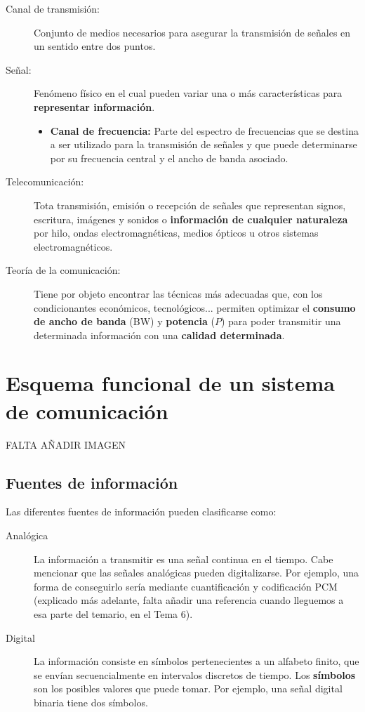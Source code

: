 \documentclass[a4paper]{book}
\begin{document}
\begin{description}
	 \item[Canal de transmisión:] Conjunto de medios necesarios para asegurar la transmisión de señales en un sentido entre dos puntos.
	 \item[Señal:] Fenómeno físico en el cual pueden variar una o más características para \textbf{representar información}.
	 \begin{itemize}
		  \item \textbf{Canal de frecuencia:} Parte del espectro de frecuencias que se destina a ser utilizado para la transmisión de señales y que puede determinarse por su frecuencia central y el ancho de banda asociado. 
	 \end{itemize} 
	 \item[Telecomunicación:] Tota transmisión, emisión o recepción de señales que representan signos, escritura, imágenes y sonidos o \textbf{información de cualquier naturaleza} por hilo, ondas electromagnéticas, medios ópticos u otros sistemas electromagnéticos.
	 \item[Teoría de la comunicación:] Tiene por objeto encontrar las técnicas más adecuadas que, con los condicionantes económicos, tecnológicos... permiten optimizar el \textbf{consumo de ancho de banda} (BW) y \textbf{potencia} ($P$) para poder transmitir una determinada información con una \textbf{calidad determinada}.
\end{description}

\section{Esquema funcional de un sistema de comunicación}
FALTA AÑADIR IMAGEN 

\subsection{Fuentes de información}

Las diferentes fuentes de información pueden clasificarse como:
\begin{description}
	 \item[Analógica] La información a transmitir es una señal continua en el tiempo. Cabe mencionar que las señales analógicas pueden digitalizarse. Por ejemplo, una forma de conseguirlo sería mediante cuantificación y codificación PCM (explicado más adelante, falta añadir una referencia cuando lleguemos a esa parte del temario, en el Tema 6).
	 \item[Digital] La información consiste en símbolos pertenecientes a un alfabeto finito, que se envían secuencialmente en intervalos discretos de tiempo. Los \textbf{símbolos} son los posibles valores que puede tomar. Por ejemplo, una señal digital binaria tiene dos símbolos.
\end{description}
\end{document}
